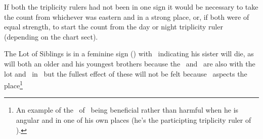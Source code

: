 If both the triplicity rulers had not been in one sign it would be necessary to take the count from whichever was eastern and in a strong place, or, if both were of equal strength, to start the count from the day or night triplicity ruler (depending on the chart sect). 

The Lot of Siblings is in a feminine sign (\Taurus) with \Saturn\, indicating his sister will die, as will both an older and his youngest brothers because the \Sun\, and \Mercury\, are also with the lot and \Saturn\, in \Taurus\, but the fullest effect of these will not be felt because \Jupiter\, aspects the place\footnote{An example of the \Square\, of \Jupiter\, being beneficial rather than harmful when he is angular and in one of his own places (he's the participting triplicity ruler of \Aquarius).}